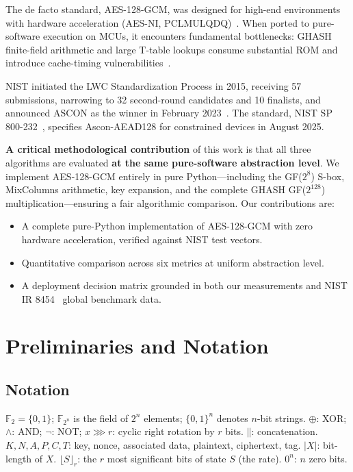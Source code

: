\documentclass[11pt,a4paper]{article}
\newcommand{\F}{\mathbb{F}}
\newcommand{\xor}{\oplus}
\newcommand{\rot}{\ggg}
\newcommand{\concat}{\mathbin{\|}}
\begin{document}
The de facto standard, AES-128-GCM, was designed for high-end environments with hardware acceleration (AES-NI, PCLMULQDQ)~\cite{nist_sp800_38d}. When ported to pure-software execution on MCUs, it encounters fundamental bottlenecks: GHASH finite-field arithmetic and large T-table lookups consume substantial ROM and introduce cache-timing vulnerabilities~\cite{page_aes_gcm}.

NIST initiated the LWC Standardization Process in 2015, receiving 57 submissions, narrowing to 32 second-round candidates and 10 finalists, and announced ASCON as the winner in February 2023~\cite{nistir8454}. The standard, NIST SP 800-232~\cite{nist_sp800_232}, specifies Ascon-AEAD128 for constrained devices in August 2025.

\textbf{A critical methodological contribution} of this work is that all three algorithms are evaluated \textbf{at the same pure-software abstraction level}. We implement AES-128-GCM entirely in pure Python---including the GF($2^8$) S-box, MixColumns arithmetic, key expansion, and the complete GHASH GF($2^{128}$) multiplication---ensuring a fair algorithmic comparison. Our contributions are:

\begin{itemize}
    \item A complete pure-Python implementation of AES-128-GCM with zero hardware acceleration, verified against NIST test vectors.
    \item Quantitative comparison across six metrics at uniform abstraction level.
    \item A deployment decision matrix grounded in both our measurements and NIST IR 8454~\cite{nistir8454} global benchmark data.
\end{itemize}

\section{Preliminaries and Notation}

\subsection{Notation}

$\F_2 = \{0,1\}$; $\F_{2^n}$ is the field of $2^n$ elements; $\{0,1\}^n$ denotes $n$-bit strings. $\xor$: XOR; $\land$: AND; $\lnot$: NOT; $x \rot r$: cyclic right rotation by $r$ bits. $\concat$: concatenation. $K, N, A, P, C, T$: key, nonce, associated data, plaintext, ciphertext, tag. $|X|$: bit-length of $X$. $\lfloor S \rfloor_r$: the $r$ most significant bits of state $S$ (the rate). $0^n$: $n$ zero bits.
\end{document}
